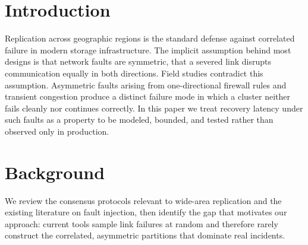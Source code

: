 \documentclass[12pt]{article}
\begin{document}
\section{Introduction}
Replication across geographic regions is the standard defense against
correlated failure in modern storage infrastructure. The implicit assumption
behind most designs is that network faults are symmetric, that a severed link
disrupts communication equally in both directions. Field studies contradict this
assumption. Asymmetric faults arising from one-directional firewall rules and
transient congestion produce a distinct failure mode in which a cluster neither
fails cleanly nor continues correctly. In this paper we treat recovery latency
under such faults as a property to be modeled, bounded, and tested rather than
observed only in production.

\section{Background}
We review the consensus protocols relevant to wide-area replication and the
existing literature on fault injection, then identify the gap that motivates our
approach: current tools sample link failures at random and therefore rarely
construct the correlated, asymmetric partitions that dominate real incidents.
\end{document}
